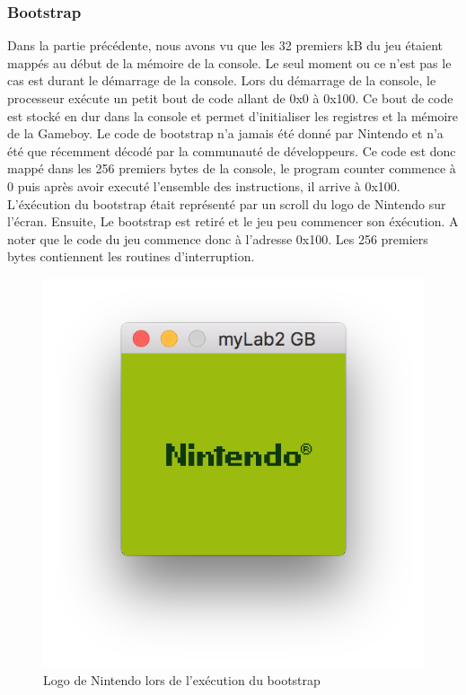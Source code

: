 \documentclass[a4paper]{article}
\begin{document}
\subsubsection{Bootstrap}
Dans la partie précédente, nous avons vu que les 32 premiers kB du jeu étaient mappés
au début de la mémoire de la console. Le seul moment ou ce n'est pas le cas est 
durant le démarrage de la console. Lors du démarrage de la console, le processeur
exécute un petit bout de code allant de 0x0 à 0x100. Ce bout de code est stocké en
dur dans la console et permet d'initialiser les registres et la mémoire de la Gameboy.
Le code de bootstrap n'a jamais été donné par Nintendo et n'a été que récemment
décodé par la communauté de développeurs. Ce code est donc mappé dans les 256 premiers
bytes de la console, le program counter commence à 0 puis après avoir executé l'ensemble
des instructions, il arrive à 0x100. L'éxécution du bootstrap était représenté par
un scroll du logo de Nintendo sur l'écran. Ensuite, Le bootstrap est retiré et le jeu peu
commencer son éxécution. A noter que le code du jeu commence donc à l'adresse
0x100. Les 256 premiers bytes contiennent les routines d'interruption.
\newline
\begin{figure}[!h]
  \centering
  \includegraphics[scale=0.6]{images/bootstrap.png}
  \caption{Logo de Nintendo lors de l'exécution du bootstrap}
\end{figure}
\end{document}
